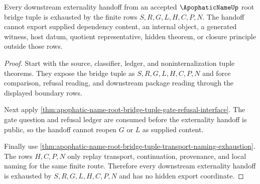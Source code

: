 \begin{theorem}
\label{thm:apophatic-name-root-bridge-tuple-terminal-exhaustion}
Every downstream externality handoff from an accepted $\ApophaticNameUp$ root bridge tuple is exhausted by the finite rows $S,R,G,L,H,C,P,N$. The handoff cannot export supplied dependency content, an internal object, a generated witness, host datum, quotient representative, hidden theorem, or closure principle outside those rows.
\end{theorem}
\begin{proof}
Start with the source, classifier, ledger, and noninternalization tuple theorems. They expose the bridge tuple as $S,R,G,L,H,C,P,N$ and force comparison, refusal reading, and downstream package reading through the displayed boundary rows.

Next apply \autoref{thm:apophatic-name-root-bridge-tuple-gate-refusal-interface}. The gate question and refusal ledger are consumed before the externality handoff is public, so the handoff cannot reopen $G$ or $L$ as supplied content.

Finally use \autoref{thm:apophatic-name-root-bridge-tuple-transport-naming-exhaustion}. The rows $H,C,P,N$ only replay transport, continuation, provenance, and local naming for the same finite route. Therefore every downstream externality handoff is exhausted by $S,R,G,L,H,C,P,N$ and has no hidden export coordinate.
\end{proof}

